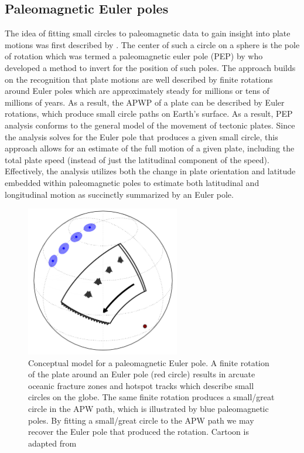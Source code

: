 \documentclass[11pt,letterpaper]{article}
\begin{document}
\subsection*{Paleomagnetic Euler poles}
The idea of fitting small circles to paleomagnetic data to gain insight into plate motions was first described by \citet{Francheteau1969a}. The center of such a circle on a sphere is the pole of rotation which was termed a paleomagnetic euler pole (PEP) by \citet{Gordon1984a} who developed a method to invert for the position of such poles. The approach builds on the recognition that plate motions are well described by finite rotations around Euler poles which are approximately steady for millions or tens of millions of years. As a result, the APWP of a plate can be described by Euler rotations, which produce small circle paths on Earth's surface. As a result, PEP analysis conforms to the general model of the movement of tectonic plates. Since the analysis solves for the Euler pole that produces a given small circle, this approach allows for an estimate of the full motion of a given plate, including the total plate speed (instead of just the latitudinal component of the speed). Effectively, the analysis utilizes both the change in plate orientation and latitude embedded within paleomagnetic poles to estimate both latitudinal and longitudinal motion as succinctly summarized by an Euler pole.

\begin{figure}
\includegraphics[width=0.6\textwidth]{fig_paleomagnetic_euler_pole.png}
\caption{Conceptual model for a paleomagnetic Euler pole. A finite rotation of the plate around an Euler pole (red circle) results in arcuate oceanic fracture zones and hotspot tracks which describe small circles on the globe. The same finite rotation produces a small/great circle in the APW path, which is illustrated by blue paleomagnetic poles. By fitting a small/great circle to the APW path we may recover the Euler pole that produced the rotation. Cartoon is adapted from \citet{Gordon1984a}}
\label{fig:pep}
\end{figure}
\end{document}

